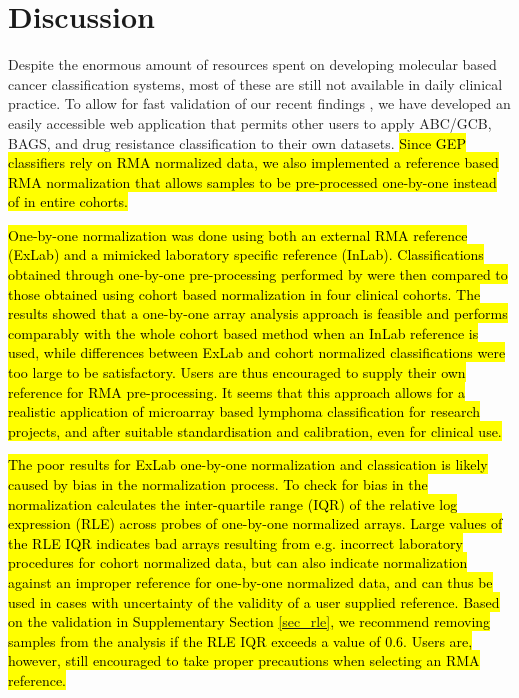 \documentclass{article}
\begin{document}
\section{Discussion}
Despite the enormous amount of resources spent on developing molecular based cancer classification systems,
most of these are still not available in daily clinical practice.
To allow for fast validation of our recent findings \citep{DybkaerBoegsted2015, Falgreen2015}, we have developed an easily accessible web application that permits other users to apply ABC/GCB, BAGS, and drug resistance classification to their own datasets. \hl{Since GEP classifiers rely on RMA normalized data, we also implemented a reference based RMA normalization that allows samples to be pre-processed one-by-one instead of in entire cohorts.}
	 
\hl{One-by-one normalization was done using both an external RMA reference (ExLab) and a mimicked laboratory specific reference (InLab). Classifications obtained through one-by-one pre-processing performed by \hemaClass{} were then compared to those obtained using cohort based normalization in four clinical cohorts. The results showed that a one-by-one array analysis approach is feasible and performs comparably with the whole cohort based method when an InLab reference is used, while differences between ExLab and cohort normalized classifications were too large to be satisfactory. Users are thus encouraged to supply their own reference for RMA pre-processing. It seems that this approach allows for a realistic application of microarray based lymphoma classification for research projects, and after suitable standardisation and calibration, even for clinical use.}

\hl{The poor results for ExLab one-by-one normalization and classication is likely caused by bias in the normalization process. To check for bias in the normalization \hemaClass{} calculates the inter-quartile range (IQR) of the relative log expression (RLE) \mbox{\citep{Bolstad2004b}} across probes of one-by-one normalized arrays. Large values of the RLE IQR indicates bad arrays resulting from e.g. incorrect laboratory procedures for cohort normalized data, but can also indicate normalization against an improper reference for one-by-one normalized data, and can thus be used in cases with uncertainty of the validity of a user supplied reference. Based on the validation in Supplementary Section \mbox{\ref{sec_rle}}, we recommend removing samples from the analysis if the RLE IQR exceeds a value of $0.6$. Users are, however, still encouraged to take proper precautions when selecting an RMA reference.}
\end{document}
